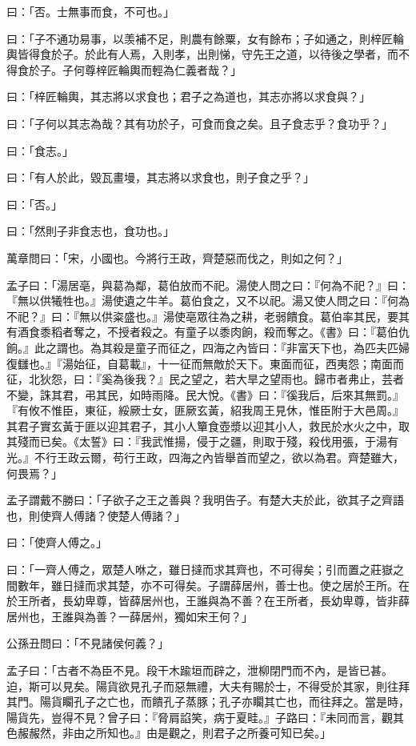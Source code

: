 \begin{pinyinscope}
曰：「否。士無事而食，不可也。」

曰：「子不通功易事，以羡補不足，則農有餘粟，女有餘布；子如通之，則梓匠輪輿皆得食於子。於此有人焉，入則孝，出則悌，守先王之道，以待後之學者，而不得食於子。子何尊梓匠輪輿而輕為仁義者哉？」

曰：「梓匠輪輿，其志將以求食也；君子之為道也，其志亦將以求食與？」

曰：「子何以其志為哉？其有功於子，可食而食之矣。且子食志乎？食功乎？」

曰：「食志。」

曰：「有人於此，毀瓦畫墁，其志將以求食也，則子食之乎？」

曰：「否。」

曰：「然則子非食志也，食功也。」

萬章問曰：「宋，小國也。今將行王政，齊楚惡而伐之，則如之何？」

孟子曰：「湯居亳，與葛為鄰，葛伯放而不祀。湯使人問之曰：『何為不祀？』曰：『無以供犧牲也。』湯使遺之牛羊。葛伯食之，又不以祀。湯又使人問之曰：『何為不祀？』曰：『無以供粢盛也。』湯使亳眾往為之耕，老弱饋食。葛伯率其民，要其有酒食黍稻者奪之，不授者殺之。有童子以黍肉餉，殺而奪之。《書》曰：『葛伯仇餉。』此之謂也。為其殺是童子而征之，四海之內皆曰：『非富天下也，為匹夫匹婦復讎也。』『湯始征，自葛載』，十一征而無敵於天下。東面而征，西夷怨；南面而征，北狄怨，曰：『奚為後我？』民之望之，若大旱之望雨也。歸市者弗止，芸者不變，誅其君，弔其民，如時雨降。民大悅。《書》曰：『徯我后，后來其無罰。』『有攸不惟臣，東征，綏厥士女，匪厥玄黃，紹我周王見休，惟臣附于大邑周。』其君子實玄黃于匪以迎其君子，其小人簞食壺漿以迎其小人，救民於水火之中，取其殘而已矣。《太誓》曰：『我武惟揚，侵于之疆，則取于殘，殺伐用張，于湯有光。』不行王政云爾，苟行王政，四海之內皆舉首而望之，欲以為君。齊楚雖大，何畏焉？」

孟子謂戴不勝曰：「子欲子之王之善與？我明告子。有楚大夫於此，欲其子之齊語也，則使齊人傅諸？使楚人傅諸？」

曰：「使齊人傅之。」

曰：「一齊人傅之，眾楚人咻之，雖日撻而求其齊也，不可得矣；引而置之莊嶽之間數年，雖日撻而求其楚，亦不可得矣。子謂薛居州，善士也。使之居於王所。在於王所者，長幼卑尊，皆薛居州也，王誰與為不善？在王所者，長幼卑尊，皆非薛居州也，王誰與為善？一薛居州，獨如宋王何？」

公孫丑問曰：「不見諸侯何義？」

孟子曰：「古者不為臣不見。段干木踰垣而辟之，泄柳閉門而不內，是皆已甚。迫，斯可以見矣。陽貨欲見孔子而惡無禮，大夫有賜於士，不得受於其家，則往拜其門。陽貨矙孔子之亡也，而饋孔子蒸豚；孔子亦矙其亡也，而往拜之。當是時，陽貨先，豈得不見？曾子曰：『脅肩諂笑，病于夏畦。』子路曰：『未同而言，觀其色赧赧然，非由之所知也。』由是觀之，則君子之所養可知已矣。」


\end{pinyinscope}

